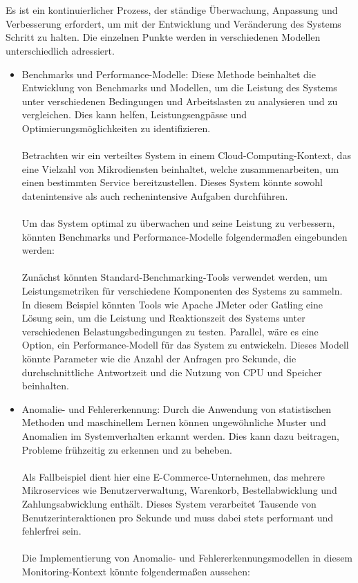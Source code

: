 \\\\
Es ist ein kontinuierlicher Prozess, der ständige Überwachung, Anpassung und Verbesserung erfordert, um mit der Entwicklung und Veränderung des Systems Schritt zu halten. Die einzelnen Punkte werden in verschiedenen Modellen unterschiedlich adressiert. 
\begin{itemize}
\item Benchmarks und Performance-Modelle: Diese Methode beinhaltet die Entwicklung von Benchmarks und Modellen, um die Leistung des Systems unter verschiedenen Bedingungen und Arbeitslasten zu analysieren und zu vergleichen. Dies kann helfen, Leistungsengpässe und Optimierungsmöglichkeiten zu identifizieren.
\\\\
Betrachten wir ein verteiltes System in einem Cloud-Computing-Kontext, das eine Vielzahl von Mikrodiensten beinhaltet, welche zusammenarbeiten, um einen bestimmten Service bereitzustellen. Dieses System könnte sowohl datenintensive als auch rechenintensive Aufgaben durchführen.
\\\\
Um das System optimal zu überwachen und seine Leistung zu verbessern, könnten Benchmarks und Performance-Modelle folgendermaßen eingebunden werden:
\\\\
Zunächst könnten Standard-Benchmarking-Tools verwendet werden, um Leistungsmetriken für verschiedene Komponenten des Systems zu sammeln. In diesem Beispiel könnten Tools wie Apache JMeter oder Gatling eine Lösung sein, um die Leistung und Reaktionszeit des Systems unter verschiedenen Belastungsbedingungen zu testen.
Parallel, wäre es eine Option, ein Performance-Modell für das System zu entwickeln. Dieses Modell könnte Parameter wie die Anzahl der Anfragen pro Sekunde, die durchschnittliche Antwortzeit und die Nutzung von CPU und Speicher beinhalten.

\item Anomalie- und Fehlererkennung: Durch die Anwendung von statistischen Methoden und maschinellem Lernen können ungewöhnliche Muster und Anomalien im Systemverhalten erkannt werden. Dies kann dazu beitragen, Probleme frühzeitig zu erkennen und zu beheben.
\\\\
Als Fallbeispiel dient hier eine E-Commerce-Unternehmen, das mehrere Mikroservices wie Benutzerverwaltung, Warenkorb, Bestellabwicklung und Zahlungsabwicklung enthält. Dieses System verarbeitet Tausende von Benutzerinteraktionen pro Sekunde und muss dabei stets performant und fehlerfrei sein.
\\\\
Die Implementierung von Anomalie- und Fehlererkennungsmodellen in diesem Monitoring-Kontext könnte folgendermaßen aussehen:


\end{itemize}
